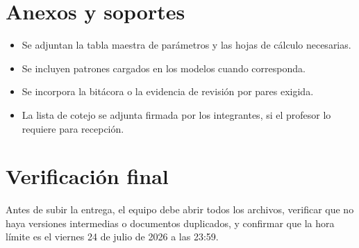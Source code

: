 \documentclass[11pt]{article}
\begin{document}
\section{Anexos y soportes}
\begin{itemize}
\item Se adjuntan la tabla maestra de par\'ametros y las hojas de c\'alculo necesarias.
\item Se incluyen patrones cargados en los modelos cuando corresponda.
\item Se incorpora la bit\'acora o la evidencia de revisi\'on por pares exigida.
\item La lista de cotejo se adjunta firmada por los integrantes, si el profesor lo requiere para recepci\'on.
\end{itemize}

\section{Verificaci\'on final}
\begin{warnbox}
Antes de subir la entrega, el equipo debe abrir todos los archivos, verificar que no haya versiones intermedias o documentos duplicados, y confirmar que la hora l\'imite es el viernes 24 de julio de 2026 a las 23:59.
\end{warnbox}
\end{document}
